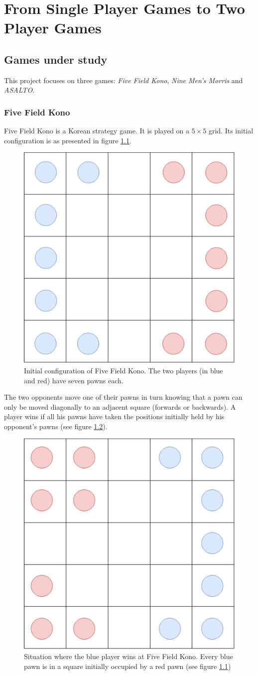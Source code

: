 
\chapter{From Single Player Games to Two Player Games}

\section{Games under study}

This project focuses on three games: \textit{Five Field Kono}, \textit{Nine Men's Morris} and \textit{ASALTO}.

\bigskip

\subsection{Five Field Kono}

Five Field Kono is a Korean strategy game. It is played on a $5\times 5$ grid. Its initial configuration is as presented in figure \ref{fig:FFK_initial}. 

\begin{figure}[h]
\centering
\includegraphics[width = 0.3\hsize]{figures/FFK_rules.png}
\caption{Initial configuration of Five Field Kono. The two players (in blue and red) have seven pawns each.}
\label{fig:FFK_initial}
\end{figure}

The two opponents move one of their pawns in turn knowing that a pawn can only be moved diagonally to an adjacent square (forwards or backwards). A player wins if all his pawns have taken the positions initially held by his opponent's pawns (see figure \ref{fig:FFK_ending}).

\begin{figure}[h]
\centering
\includegraphics[width = 0.3\hsize]{figures/FFK_ending.png}
\caption{Situation where the blue player wins at Five Field Kono. Every blue pawn is in a square initially occupied by a red pawn (see figure \ref{fig:FFK_initial})}
\label{fig:FFK_ending}
\end{figure}


